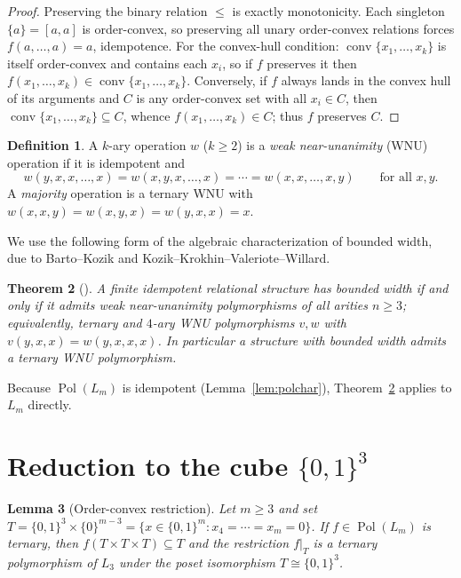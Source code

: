 \documentclass[11pt]{amsart}
\theoremstyle{plain}
\newtheorem{thm}{Theorem}[section]
\newtheorem{lem}[thm]{Lemma}
\theoremstyle{definition}
\newtheorem{defn}[thm]{Definition}
\DeclareMathOperator{\conv}{conv}
\DeclareMathOperator{\Pol}{Pol}
\newcommand{\B}{\{0,1\}}
\begin{document}
\begin{proof}
  Preserving the binary relation $\le$ is exactly monotonicity.  Each
  singleton $\{a\}=[a,a]$ is order-convex, so preserving all unary
  order-convex relations forces $f(a,\dots,a)=a$, idempotence.  For the
  convex-hull condition: $\conv\{x_1,\dots,x_k\}$ is itself
  order-convex and contains each $x_i$, so if $f$ preserves it then
  $f(x_1,\dots,x_k)\in\conv\{x_1,\dots,x_k\}$.  Conversely, if $f$
  always lands in the convex hull of its arguments and $C$ is any
  order-convex set with all $x_i\in C$, then
  $\conv\{x_1,\dots,x_k\}\subseteq C$, whence $f(x_1,\dots,x_k)\in C$;
  thus $f$ preserves $C$.
\end{proof}

\begin{defn}
  A $k$-ary operation $w$ ($k\ge2$) is a \emph{weak near-unanimity}
  (WNU) operation if it is idempotent and
  \[
    w(y,x,x,\dots,x)=w(x,y,x,\dots,x)=\cdots=w(x,x,\dots,x,y)
    \qquad\text{for all }x,y .
  \]
  A \emph{majority} operation is a ternary WNU with
  $w(x,x,y)=w(x,y,x)=w(y,x,x)=x$.
\end{defn}

We use the following form of the algebraic characterization of bounded
width, due to Barto--Kozik and Kozik--Krokhin--Valeriote--Willard.

\begin{thm}[\cite{BartoKozik,KKVW}]\label{thm:bw}
  A finite idempotent relational structure has bounded width if and
  only if it admits weak near-unanimity polymorphisms of all arities
  $n\ge 3$; equivalently, ternary and $4$-ary WNU polymorphisms $v,w$
  with $v(y,x,x)=w(y,x,x,x)$.  In particular a structure with bounded
  width admits a ternary WNU polymorphism.
\end{thm}

Because $\Pol(L_m)$ is idempotent (Lemma~\ref{lem:polchar}),
Theorem~\ref{thm:bw} applies to $L_m$ directly.

\section{Reduction to the cube $\B^3$}

\begin{lem}[Order-convex restriction]\label{lem:restrict}
  Let $m\ge 3$ and set
  $T=\B^3\times\{0\}^{m-3}=\{x\in\B^m: x_4=\cdots=x_m=0\}$.  If
  $f\in\Pol(L_m)$ is ternary, then $f(T\times T\times T)\subseteq T$
  and the restriction $f|_T$ is a ternary polymorphism of $L_3$ under
  the poset isomorphism $T\cong\B^3$.
\end{lem}
\end{document}
